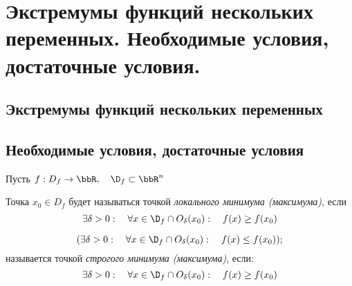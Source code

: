 \chapter{Экстремумы функций нескольких переменных. Необходимые условия, достаточные условия.}
\section{Экстремумы функций нескольких переменных}
\section{Необходимые условия, достаточные условия}

Пусть $f:D_f\to\bbR, \quad \D_f \subset\bbR^n$
\begin{defn}
Точка $x_0\in D_f$ будет называться точкой \textit{локального минимума (максимума)}, если
\begin{equation}\label{lec31e1}
\exists \delta>0:\quad\forall x\in\D_f\cap O_{\delta}(x_0): \quad f(x)\ge f(x_0)
\end{equation} 

\begin{equation}\label{lec31e2}
(\exists \delta>0:\quad\forall x\in\D_f\cap O_{\delta}(x_0): \quad f(x)\le f(x_0));
\end{equation} 
называется точкой \textit{строгого минимума (максимума)}, если:
\begin{equation}
\exists \delta>0:\quad\forall x\in\D_f\cap O_{\delta}(x_0): \quad f(x)\ge f(x_0)
\end{equation}

\end{defn} 